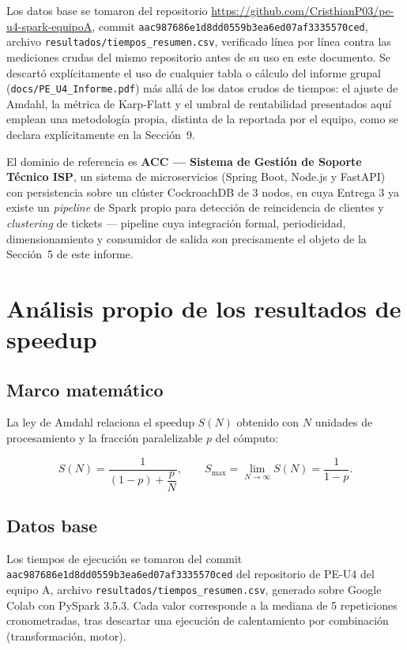 \documentclass[11pt]{article}
\begin{document}
Los datos base se tomaron del repositorio
\url{https://github.com/CristhianP03/pe-u4-spark-equipoA}, commit
\texttt{aac987686e1d8dd0559b3ea6ed07af3335570ced}, archivo
\texttt{resultados/tiempos\_resumen.csv}, verificado línea por línea
contra las mediciones crudas del mismo repositorio antes de su uso en
este documento. Se descartó explícitamente el uso de cualquier tabla o
cálculo del informe grupal (\texttt{docs/PE\_U4\_Informe.pdf}) más allá
de los datos crudos de tiempos: el ajuste de Amdahl, la métrica de
Karp-Flatt y el umbral de rentabilidad presentados aquí emplean una
metodología propia, distinta de la reportada por el equipo, como se
declara explícitamente en la Sección~9.

El dominio de referencia es \textbf{ACC --- Sistema de Gestión de
Soporte Técnico ISP}, un sistema de microservicios (Spring Boot, Node.js
y FastAPI) con persistencia sobre un clúster CockroachDB de 3 nodos, en
cuya Entrega 3 ya existe un \emph{pipeline} de Spark propio para
detección de reincidencia de clientes y \emph{clustering} de tickets ---
pipeline cuya integración formal, periodicidad, dimensionamiento y
consumidor de salida son precisamente el objeto de la Sección~5 de este
informe.

\section{Análisis propio de los resultados de speedup}

\subsection{Marco matemático}

La ley de Amdahl relaciona el speedup $S(N)$ obtenido con $N$ unidades
de procesamiento y la fracción paralelizable $p$ del cómputo:

\begin{equation}
S(N) = \frac{1}{(1-p) + \dfrac{p}{N}}, \qquad
S_{\max} = \lim_{N\to\infty} S(N) = \frac{1}{1-p}.
\label{eq:amdahl}
\end{equation}

\subsection{Datos base}

Los tiempos de ejecución se tomaron del commit
\texttt{aac987686e1d8dd0559b3ea6ed07af3335570ced} del repositorio de
PE-U4 del equipo A, archivo \texttt{resultados/tiempos\_resumen.csv},
generado sobre Google Colab con PySpark 3.5.3. Cada valor corresponde a
la mediana de 5 repeticiones cronometradas, tras descartar una ejecución
de calentamiento por combinación (transformación, motor).
\end{document}
